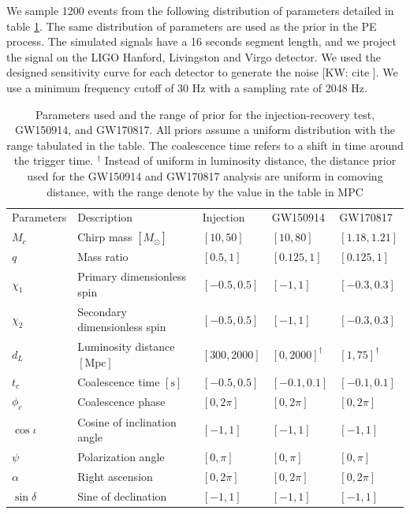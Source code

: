 \documentclass[twocolumn]{aastex631}
\newcommand{\kw}[1]{{\color{rb4}[KW: #1 ]}}
\begin{document}
We sample 1200 events from the following distribution of parameters detailed in
table \ref{tab:parameters}.
The same distribution of parameters are used as the prior in the PE process.
The simulated signals have a 16 seconds segment length,
and we project the signal on the LIGO Hanford, Livingston and Virgo detector.
We used the designed sensitivity curve for each detector to generate the noise \kw{cite}.
We use a minimum frequency cutoff of 30 Hz with a sampling rate of 2048 Hz.

\begin{table}[hbt!]
    \begin{center}
    \begin{tabular}{ l l l l l }
    \hline
    \hline
    Parameters &  Description & Injection & GW150914 & GW170817\\

    $M_c$ & Chirp mass $[M_\odot]$& $[10, 50]$ & $[10,80]$ & $[1.18,1.21]$ \\
    $q$ & Mass ratio & $[0.5, 1]$ & $[0.125,1]$ & $[0.125,1]$ \\
    $\chi_1$ & Primary dimensionless spin& $[-0.5, 0.5]$ & $[-1,1]$ & $[-0.3,0.3]$ \\
    $\chi_2$ & Secondary dimensionless spin & $[-0.5, 0.5]$ & $[-1,1]$ & $[-0.3,0.3]$ \\
    $d_L$ & Luminosity distance $[\textrm{Mpc}]$ & $[300, 2000]$ & $[0, 2000]^\dag$ & $[1, 75]^\dag$ \\
    $t_c$ & Coalescence time $[\textrm{s}]$& $[-0.5, 0.5]$ & $[-0.1, 0.1]$ & $[-0.1, 0.1]$ \\
    $\phi_c$ & Coalescence phase & $[0, 2\pi]$ & $[0, 2\pi]$ & $[0, 2\pi]$ \\
    $\cos{\iota}$ & Cosine of inclination angle & $[-1, 1]$ & $[-1, 1]$ & $[-1, 1]$ \\
    $\psi$ & Polarization angle & $[0, \pi]$ & $[0, \pi]$ & $[0, \pi]$ \\
    $\alpha$ & Right ascension & $[0, 2\pi]$ & $[0, 2\pi]$ & $[0, 2\pi]$ \\
    $\sin{\delta}$ & Sine of declination & $[-1, 1]$ & $[-1, 1]$ & $[-1, 1]$ \\

    \hline
    \hline
    \end{tabular}
    \caption{Parameters used and the range of prior for the injection-recovery
    test, GW150914, and GW170817. All priors assume a uniform distribution with
    the range tabulated in the table. The coalescence time refers to a shift in
    time around the trigger time. $^\dag$ Instead of uniform in luminosity
    distance, the distance prior used for the GW150914 and GW170817 analysis are
    uniform in comoving distance, with the range denote by the value in the
    table in $\textrm{MPC}$}
    \label{tab:parameters}
    \end{center}
\end{table}
\end{document}
